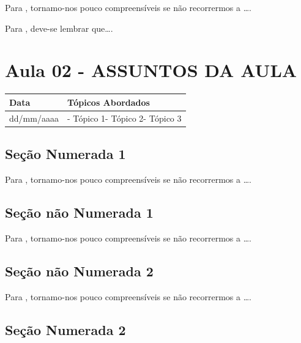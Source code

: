 \documentclass[
]{book}
\begin{document}
Para \citet{BOCK2001}, tornamo-nos pouco compreensíveis se não recorrermos a \ldots.

Para \citet{DAVIDOFF2001}, deve-se lembrar que\ldots.

\hypertarget{aula-02---assuntos-da-aula-4}{%
\section{Aula 02 - ASSUNTOS DA AULA}\label{aula-02---assuntos-da-aula-4}}

\begin{longtable}[]{@{}ll@{}}
\toprule()
Data & Tópicos Abordados \\
\midrule()
\endhead
dd/mm/aaaa & - Tópico 1- Tópico 2- Tópico 3 \\
\bottomrule()
\end{longtable}

\hypertarget{seuxe7uxe3o-numerada-1-18}{%
\subsection{Seção Numerada 1}\label{seuxe7uxe3o-numerada-1-18}}

Para \citet{BOCK2001}, tornamo-nos pouco compreensíveis se não recorrermos a \ldots.

\hypertarget{seuxe7uxe3o-nuxe3o-numerada-1-36}{%
\subsection*{Seção não Numerada 1}\label{seuxe7uxe3o-nuxe3o-numerada-1-36}}

Para \citet{BOCK2001}, tornamo-nos pouco compreensíveis se não recorrermos a \ldots.

\hypertarget{seuxe7uxe3o-nuxe3o-numerada-2-54}{%
\subsection*{Seção não Numerada 2}\label{seuxe7uxe3o-nuxe3o-numerada-2-54}}

Para \citet{BOCK2001}, tornamo-nos pouco compreensíveis se não recorrermos a \ldots.

\hypertarget{seuxe7uxe3o-numerada-2-18}{%
\subsection{Seção Numerada 2}\label{seuxe7uxe3o-numerada-2-18}}
\end{document}
